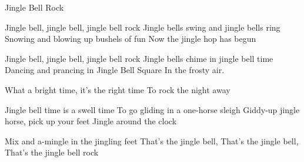 \begin{sang}{Jingle Bell Rock}{}

\begin{vers}
Jingle bell, jingle bell, jingle bell rock
Jingle bells swing and jingle bells ring			
Snowing and blowing up bushels of fun
Now the jingle hop has begun
\end{vers}
\begin{vers}						
Jingle bell, jingle bell, jingle bell rock
Jingle bells chime in jingle bell time
Dancing and prancing in Jingle Bell Square
In the frosty air.
\end{vers}
\begin{vers}	
What a bright time, it's the right time
To rock the night away
\end{vers}
\begin{vers}						
Jingle bell time is a swell time
To go gliding in a one-horse sleigh
Giddy-up jingle horse, pick up your feet
Jingle around the clock
\end{vers}
\begin{vers}
Mix and a-mingle in the jingling feet
That's the jingle bell,
That's the jingle bell,
That's the jingle bell rock
\end{vers}

\end{sang}